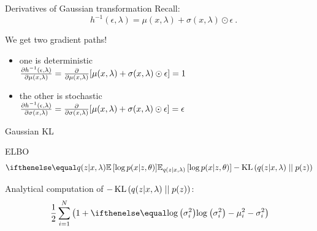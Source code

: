 \begin{frame}{Derivatives of Gaussian transformation}
Recall: $$\quad h^{-1}(\epsilon, \lambda) = \mu(x,\lambda) + \sigma(x,\lambda) \odot \epsilon \ . $$

We get two gradient paths! \pause \\

\begin{itemize}
	\item one is \alert{deterministic}\\
	$\pdv{h^{-1}(\epsilon, \lambda)}{\mu(x,\lambda)} = \pdv{\mu(x,\lambda)}[\mu(x,\lambda) + \sigma(x,\lambda) \odot \epsilon] = 1$ \pause
	\item the other is  \alert{stochastic}\\
	$\pdv{h^{-1}(\epsilon, \lambda)}{\sigma(x,\lambda)} = \pdv{\sigma(x,\lambda)}[ \mu(x,\lambda) + \sigma(x,\lambda) \odot \epsilon] = \epsilon$
\end{itemize}

\end{frame}

\begin{frame}{Gaussian KL}
\begin{block}{ELBO}
\begin{equation*}
\E[q(z|x,\lambda)]{\log p(x|z,\theta)} - \KL{q(z|x,\lambda)}{p(z)}
\end{equation*}
\end{block}
\pause
Analytical computation of $ -\operatorname{KL}\left(q(z|x,\lambda)\mid\mid p(z)\right) $:
\begin{equation*}
\frac{1}{2}\sum_{i=1}^{N}\left(1 + \loga{\sigma^{2}_{i}} -
\mu^{2}_{i} - \sigma^{2}_{i} \right)
\end{equation*}
\end{frame}

